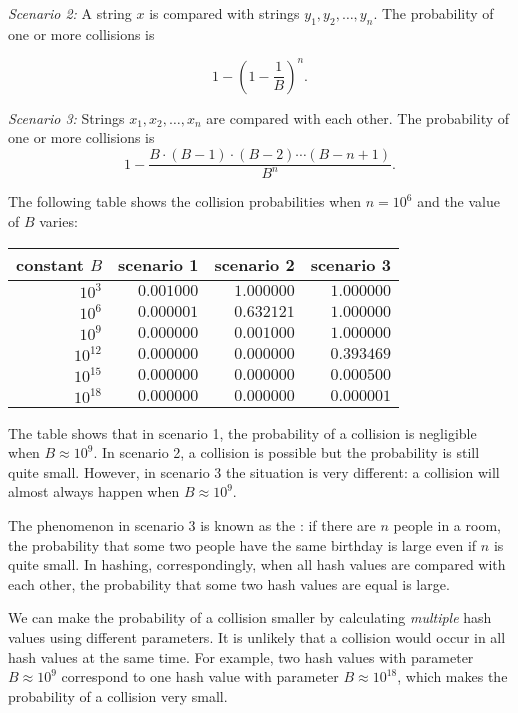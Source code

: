 \textit{Scenario 2:} A string $x$ is compared with strings
$y_1,y_2,\ldots,y_n$.
The probability of one or more collisions is

\[1-(1-\frac{1}{B})^n.\]

\textit{Scenario 3:} Strings $x_1,x_2,\ldots,x_n$
are compared with each other.
The probability of one or more collisions is
\[ 1 - \frac{B \cdot (B-1) \cdot (B-2) \cdots (B-n+1)}{B^n}.\]

The following table shows the collision probabilities
when $n=10^6$ and the value of $B$ varies:

\begin{center}
\begin{tabular}{rrrr}
constant $B$ & scenario 1 & scenario 2 & scenario 3 \\
\hline
$10^3$ & $0.001000$ & $1.000000$ & $1.000000$ \\
$10^6$ & $0.000001$ & $0.632121$ & $1.000000$ \\
$10^9$ & $0.000000$ & $0.001000$ & $1.000000$ \\
$10^{12}$ & $0.000000$ & $0.000000$ & $0.393469$ \\
$10^{15}$ & $0.000000$ & $0.000000$ & $0.000500$ \\
$10^{18}$ & $0.000000$ & $0.000000$ & $0.000001$ \\
\end{tabular}
\end{center}

The table shows that in scenario 1,
the probability of a collision is negligible
when $B \approx 10^9$.
In scenario 2, a collision is possible but the
probability is still quite small.
However, in scenario 3 the situation is very different:
a collision will almost always happen when
$B \approx 10^9$.


The phenomenon in scenario 3 is known as the
: if there are $n$ people
in a room, the probability that some two people
have the same birthday is large even if $n$ is quite small.
In hashing, correspondingly, when all hash values are compared
with each other, the probability that some two
hash values are equal is large.

We can make the probability of a collision
smaller by calculating \emph{multiple} hash values
using different parameters.
It is unlikely that a collision would occur
in all hash values at the same time.
For example, two hash values with parameter
$B \approx 10^9$ correspond to one hash
value with parameter $B \approx 10^{18}$,
which makes the probability of a collision very small.

